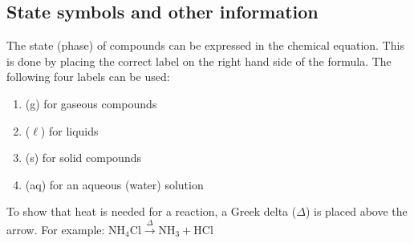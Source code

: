         \subsection*{State symbols and other information}
    \nopagebreak
      \label{m38727*id65920}The state (phase) of compounds can be expressed in the chemical equation. This is done by placing the correct label on the right hand side of the formula. The following four labels can be used:\par \noindent 
      \label{m38727*id65925}\begin{enumerate}[noitemsep, label=\textbf{\arabic*}.] 
\item (g) for gaseous compounds
\label{m38727*uid28}\item ($\ell$) for liquids
\label{m38727*uid29}\item (s) for solid compounds
\label{m38727*uid30}\item (aq) for an aqueous (water) solution
\end{enumerate}
\label{m38727*eip-536}To show that heat is needed for a reaction, a Greek delta ($\Delta $) is placed above the arrow. For example: $\text{NH}_{4}\text{Cl} \xrightarrow{\Delta} \text{NH}_{3} + \text{HCl}$ 
	\par
\label{m38727*secfhsst!!!underscore!!!id967} 
      \noindent
